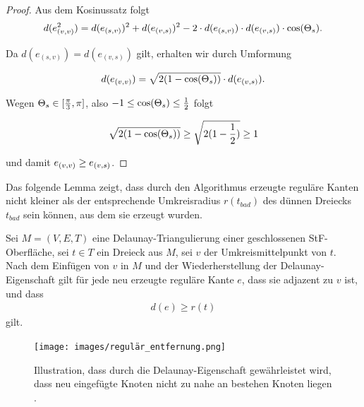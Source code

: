 \begin{proof}

Aus dem Kosinussatz folgt 
\begin{align*}
    d(\irregulaereKante*^2) &=  d(e_{(s,v)})^2 + d(e_{(v,s)})^2-2 \cdot d(e_{(s,v)})  \cdot d(e_{(v,s)}) \cdot \cos(\gesamtwinkel*[s]). \\
\end{align*}

Da $d(e_{(s,v)}) = d(e_{(v,s)})$ gilt, erhalten wir durch Umformung

\begin{align*}
d(\irregulaereKante*)&= \sqrt{2 (1-\cos(\gesamtwinkel*[s]))}\cdot d(\regulaereKante*).\\
\end{align*}

Wegen $\gesamtwinkel*[s] \in  [\frac{\pi}{3}, \pi]$, also $-1 \leq \cos(\gesamtwinkel*[s]) \leq \frac{1}{2}$  folgt

\begin{align*}
     \sqrt{2 (1-\cos(\gesamtwinkel*[s]))} \geq \sqrt{2 (1-\frac{1}{2})} \geq 1\\
\end{align*}

und damit $\irregulaereKante* \geq \regulaereKante* $. 


\end{proof}



Das folgende Lemma zeigt, dass durch den Algorithmus erzeugte reguläre Kanten nicht kleiner als der entsprechende Umkreisradius $r(t_{bad})$ des dünnen Dreiecks $t_{bad}$ sein können, aus dem sie erzeugt wurden.

\newpage
\begin{lemma}
\label{le:regulär_entfernung}
Sei $M = (V,E,T)$ eine Delaunay-Triangulierung  einer geschlossenen StF-Oberfläche, sei $t \in T$ ein Dreieck aus $M$, sei $v$ der Umkreismittelpunkt von $t$.   \\

 



Nach dem Einfügen von $v$ in $M$ und der Wiederherstellung der Delaunay-Eigenschaft gilt für jede neu erzeugte reguläre Kante $e$, dass sie adjazent zu $v$ ist, und dass 
\begin{align*}
    d(e) \geq r(t) 
\end{align*} gilt.

\end{lemma}
 \begin{figure}[h]
    \centering
    \texttt{[image: images/regulär\_entfernung.png]}
    \caption{Illustration, dass durch die Delaunay-Eigenschaft gewährleistet wird, dass neu eingefügte Knoten nicht zu nahe an bestehen Knoten liegen    \cite{SHEWCHUK:2002:chuws}.}
    \label{fig:regulär_entfernung}
\end{figure}

